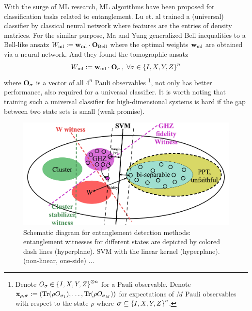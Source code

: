 \documentclass[
aps,
pra,
twocolumn,
floatfix,
]{revtex4-2}
\theoremstyle{plain}
\theoremstyle{definition}
\newcommand{\ew}{W}
\newcommand{\pob}{O}
\newcommand{\dm}{\rho}
\newcommand{\ml}{\text{ml}}
\newcommand{\bellineq}{\textup{Bell}}
\newcommand{\sx}{\hat{\sigma}_x}
\newcommand{\sy}{\hat{\sigma}_y}
\newcommand{\sz}{\hat{\sigma}_z}
\newcommand{\bmsigma}{\bm{\sigma}}
\begin{document}
With the surge of ML research, ML algorithms have been proposed for classification tasks related to entanglement.
Lu et. al \cite{luSeparabilityEntanglementClassifierMachine2018} 
trained a (universal)  classifier by classical neural network
where features are the entries of density matrices.
For the similar purpose, Ma and Yung \cite{maTransformingBellInequalities2018} generalized Bell inequalities to a Bell-like ansatz $\ew_{\ml}:=\vbw_{\ml}\cdot\vb{\pob}_{\bellineq}$ where the optimal weights $\vbw_{\ml}$ are obtained via a neural network.
And they found the tomographic ansatz
\begin{equation}
	\ew_{\ml} := 
	\vbw_{\ml} \cdot \vb{\pob}_{\sigma} \, , \; \forall \sigma \in  \qty{I,X,Y,Z}^n
	\label{eq:tomographic_ansatz}
\end{equation}
where $\vb{\pob}_{\sigma}$ is a vector of all $4^n$ Pauli observables
\footnote{
	Denote $\pob_{\sigma}\in \qty{I,X,Y,Z}^{\otimes n}$ for a Pauli observable.
	Denote $\vbx_{\dm,\bmsigma}:=(\Tr(\dm\pob_{\sigma_1}),\dots,\Tr(\dm\pob_{\sigma_M}))$ for expectations of $M$ Pauli observables with respect to the state $\dm$ where $\bmsigma\subseteq \qty{I,X,Y,Z}^n$.
},
not only has better performance, 
also required \cite{luTomographyNecessaryUniversal2016} for a universal  classifier.
It is worth noting that training such a universal classifier for high-dimensional systems is hard if the gap between two state sets is small (weak promise).

\begin{figure}[!ht]
	\centering
		\centering
		\includegraphics[width=.9\linewidth]{schematic_entangle.png}
	\caption{Schematic diagram for entanglement detection methods: entanglement witnesses for different states are depicted by colored dash lines (hyperplane). SVM with the linear kernel (hyperplane).  (non-linear, one-side) ... }
	\label{fig:entangle}
\end{figure}
\end{document}

